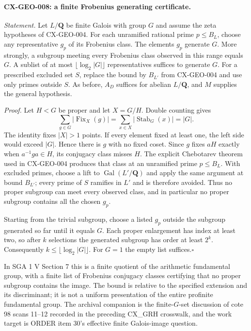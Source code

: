 \paragraph{CX-GEO-008: a finite Frobenius generating certificate.}
\emph{Statement.} Let $L/\mathbf Q$ be finite Galois with group $G$ and
assume the zeta hypotheses of CX-GEO-004. For each unramified rational
prime $p\leq B_L$, choose any representative $g_p$ of its Frobenius class.
The elements $g_p$ generate $G$. More strongly, a subgroup meeting every
Frobenius class observed in this range equals $G$. A sublist of at most
$\lfloor\log_2|G|\rfloor$ representatives suffices to generate $G$.
For a prescribed excluded set $S$, replace the bound by $B_{L'}$ from
CX-GEO-004 and use only primes outside $S$. As before, $A_D$ suffices for
abelian $L/\mathbf Q$, and $M$ supplies the general hypothesis.

\emph{Proof.} Let $H<G$ be proper and let $X=G/H$. Double counting gives
\[
 \sum_{g\in G}|\operatorname{Fix}_X(g)|
      =\sum_{x\in X}|\operatorname{Stab}_G(x)|=|G|.
\]
The identity fixes $|X|>1$ points. If every element fixed at least one,
the left side would exceed $|G|$. Hence there is $g$ with no fixed coset.
Since $g$ fixes $aH$ exactly when $a^{-1}ga\in H$, its conjugacy class
misses $H$. The explicit Chebotarev theorem used in CX-GEO-004 produces
that class at an unramified prime $p\leq B_L$. With excluded primes,
choose a lift to $\operatorname{Gal}(L'/\mathbf Q)$ and apply the same
argument at bound $B_{L'}$; every prime of $S$ ramifies in $L'$ and is
therefore avoided. Thus no proper subgroup can meet every observed class,
and in particular no proper subgroup contains all the chosen $g_p$.

Starting from the trivial subgroup, choose a listed $g_p$ outside the
subgroup generated so far until it equals $G$. Each proper enlargement
has index at least two, so after $k$ selections the generated subgroup has
order at least $2^k$. Consequently $k\leq\lfloor\log_2|G|\rfloor$.
For $G=1$ the empty list suffices.\hfill$\square$

In SGA 1 V Section 7 this is a finite quotient of the arithmetic
fundamental group, with a finite list of Frobenius conjugacy classes
certifying that no proper subgroup contains the image. The bound is
relative to the specified extension and its discriminant; it is not a
uniform presentation of the entire profinite fundamental group. The
archival companion is the finite-$G$-set discussion of cote 98 scans
11--12 recorded in the preceding CX\_GRH crosswalk, and the work target
is ORDER item 30's effective finite Galois-image question.

